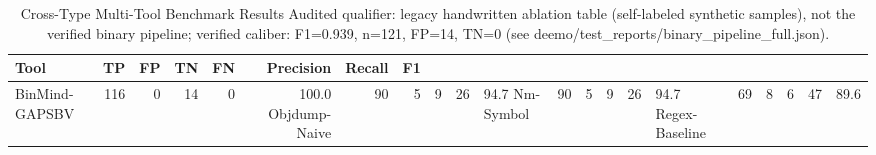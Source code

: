 \begin{table}[htbp]
\centering
\caption{Cross-Type Multi-Tool Benchmark Results Audited qualifier: legacy handwritten ablation table (self-labeled synthetic samples), not the verified binary pipeline; verified caliber: F1=0.939, n=121, FP=14, TN=0 (see deemo/test_reports/binary_pipeline_full.json).}\label{tab:cross}
\begin{tabular}{lrrrrrrr}
\toprule
Tool & TP & FP & TN & FN & Precision & Recall & F1 \\
\midrule
BinMind-GAPSBV & 116 & 0 & 14 & 0 & 100.0%
Objdump-Naive & 90 & 5 & 9 & 26 & 94.7%
Nm-Symbol & 90 & 5 & 9 & 26 & 94.7%
Regex-Baseline & 69 & 8 & 6 & 47 & 89.6%
\bottomrule
\end{tabular}
\end{table}
